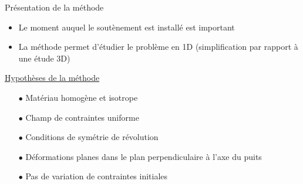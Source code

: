 \documentclass{beamer}
\begin{document}
\begin{frame}{Présentation de la méthode}

\begin{itemize}
    \item Le moment auquel le soutènement est installé est important 
    \item La méthode permet d'étudier le problème en 1D  (simplification par rapport à une étude 3D)
\end{itemize}
\vspace{0.3cm}

\underline{Hypothèses de la méthode}

  \begin{itemize}
    \item[$\bullet$] Matériau homogène et isotrope
    \item[$\bullet$] Champ de contraintes uniforme
    \item[$\bullet$] Conditions de symétrie de révolution
    \item[$\bullet$] Déformations planes dans le plan perpendiculaire à l'axe du puits
    \item[$\bullet$] Pas de variation de contraintes initiales 
  \end{itemize}   


\end{frame}
\end{document}
